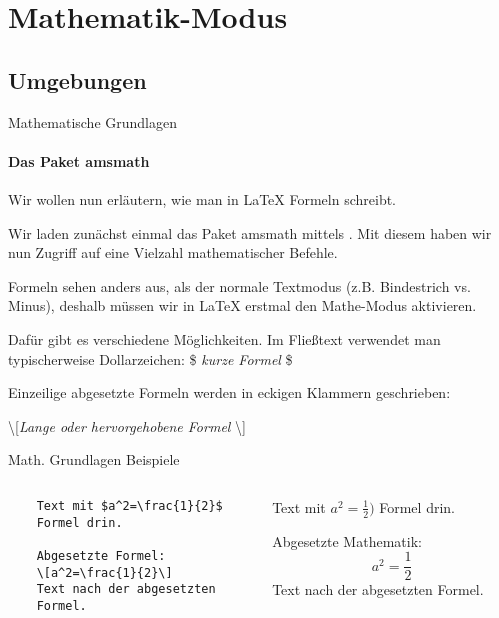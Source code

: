 \section{Mathematik-Modus}
\subsection{Umgebungen}
\begin{frame}[fragile]{Mathematische Grundlagen}
\framesubtitle{Das Paket \textcolor{pkg}{amsmath}}
Wir wollen nun erläutern, wie man in \LaTeX{} Formeln schreibt. 

\medskip\pause
Wir laden zunächst einmal das Paket \textcolor{pkg}{amsmath} mittels . Mit diesem haben wir nun Zugriff auf eine Vielzahl mathematischer Befehle. 

\medskip\pause
Formeln sehen anders aus, als der normale Textmodus (z.B. Bindestrich vs. Minus), deshalb müssen wir in \LaTeX{} erstmal den Mathe-Modus aktivieren. 

\medskip\pause
Dafür gibt es verschiedene Möglichkeiten. Im Fließtext verwendet man typischerweise Dollarzeichen: \$ \emph{kurze Formel} \$

Einzeilige abgesetzte Formeln werden in eckigen Klammern geschrieben: 
\begin{center}
\textbackslash[\emph{Lange oder hervorgehobene Formel} \textbackslash]
\end{center}
\end{frame}

\begin{frame}[fragile]{Math. Grundlagen Beispiele}

\begin{columns}
\begin{column}{.48\textwidth}\footnotesize
\begin{codeblock}
\begin{verbatim}
	Text mit $a^2=\frac{1}{2}$
	Formel drin.

	Abgesetzte Formel:
	\[a^2=\frac{1}{2}\]
	Text nach der abgesetzten
	Formel.
\end{verbatim}
\end{codeblock}
\end{column}
%
\begin{column}{.45\textwidth}		
	Text mit $a^2=\frac{1}{2})$ Formel drin.

	Abgesetzte Mathematik:
	\[a^2=\frac{1}{2}\]
	Text nach der abgesetzten Formel.
\end{column}

\end{columns}
\end{frame}

